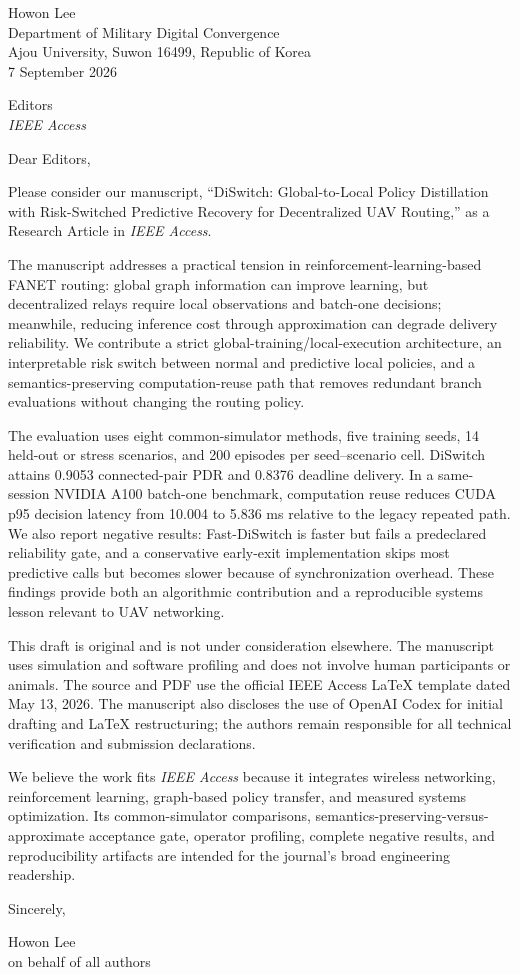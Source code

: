 \documentclass{article}
\begin{document}
\begin{flushright}
Howon Lee\\
Department of Military Digital Convergence\\
Ajou University, Suwon 16499, Republic of Korea\\
7 September 2026
\end{flushright}

Editors\\
\emph{IEEE Access}

Dear Editors,

Please consider our manuscript, ``DiSwitch: Global-to-Local Policy Distillation with Risk-Switched Predictive Recovery for Decentralized UAV Routing,'' as a Research Article in \emph{IEEE Access}.

The manuscript addresses a practical tension in reinforcement-learning-based FANET routing: global graph information can improve learning, but decentralized relays require local observations and batch-one decisions; meanwhile, reducing inference cost through approximation can degrade delivery reliability. We contribute a strict global-training/local-execution architecture, an interpretable risk switch between normal and predictive local policies, and a semantics-preserving computation-reuse path that removes redundant branch evaluations without changing the routing policy.

The evaluation uses eight common-simulator methods, five training seeds, 14 held-out or stress scenarios, and 200 episodes per seed--scenario cell. DiSwitch attains 0.9053 connected-pair PDR and 0.8376 deadline delivery. In a same-session NVIDIA A100 batch-one benchmark, computation reuse reduces CUDA p95 decision latency from 10.004 to 5.836 ms relative to the legacy repeated path. We also report negative results: Fast-DiSwitch is faster but fails a predeclared reliability gate, and a conservative early-exit implementation skips most predictive calls but becomes slower because of synchronization overhead. These findings provide both an algorithmic contribution and a reproducible systems lesson relevant to UAV networking.

This draft is original and is not under consideration elsewhere. The manuscript uses simulation and software profiling and does not involve human participants or animals. The source and PDF use the official IEEE Access LaTeX template dated May 13, 2026. The manuscript also discloses the use of OpenAI Codex for initial drafting and LaTeX restructuring; the authors remain responsible for all technical verification and submission declarations.

We believe the work fits \emph{IEEE Access} because it integrates wireless networking, reinforcement learning, graph-based policy transfer, and measured systems optimization. Its common-simulator comparisons, semantics-preserving-versus-approximate acceptance gate, operator profiling, complete negative results, and reproducibility artifacts are intended for the journal's broad engineering readership.

Sincerely,

\vspace{2em}
Howon Lee\\
on behalf of all authors
\end{document}
